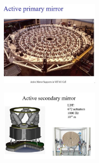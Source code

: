 \documentclass[a4paper,11pt]{article}
\begin{document}
\begin{figure}[h!!]
        \centering
        \includegraphics[width=5cm]{17.jpg}
        \label{}
    \end{figure}
    \begin{figure}[h!!]
        \centering
        \includegraphics[width=5cm]{18.jpg}
        \label{}
    \end{figure}
\end{document}
